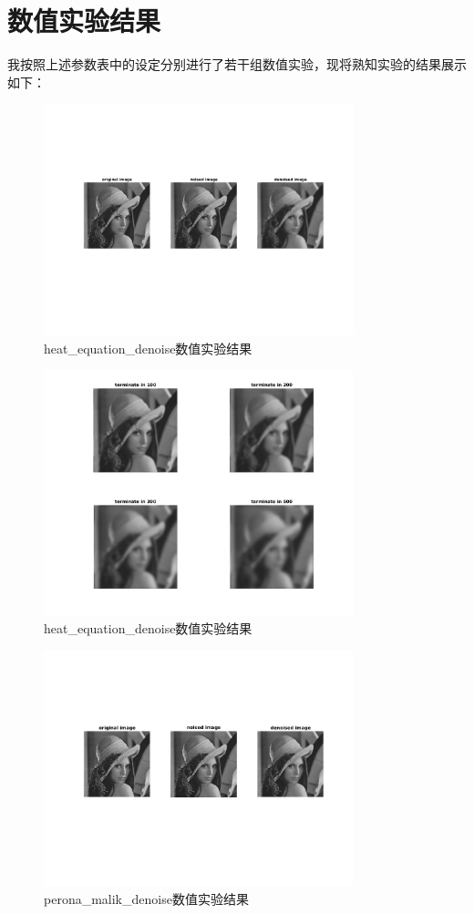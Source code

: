 \documentclass[a4paper, UTF8]{ctexrep}
\begin{document}
			\section{数值实验结果}
				我按照上述参数表中的设定分别进行了若干组数值实验，现将熟知实验的结果展示如下：
				\begin{figure}[htbp!]
					\centering
					\includegraphics[width=0.8\textwidth]{hw2_fig1.png}
					\caption{heat\_equation\_denoise数值实验结果}
					\label{}
				\end{figure}
				\begin{figure}[htbp!]
					\centering
					\includegraphics[width=0.8\textwidth]{hw2_fig2.png}
					\caption{heat\_equation\_denoise数值实验结果}
					\label{}
				\end{figure}
				\begin{figure}[htbp!]
					\centering
					\includegraphics[width=0.8\textwidth]{hw2_fig3.png}
					\caption{perona\_malik\_denoise数值实验结果}
					\label{}
				\end{figure}
\end{document}
